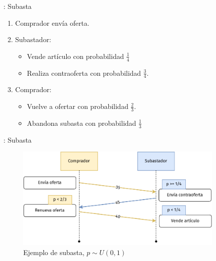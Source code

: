 %
%
%

\begin{frame}{\insertsection: Subasta}
	\begin{enumerate}
		\item Comprador envía oferta.
		\item Subastador:
			\begin{itemize}
				\item Vende artículo con probabilidad $\frac{1}{4}$
				\item Realiza contraoferta con probabilidad $\frac{3}{4}$.
			\end{itemize}
		\item Comprador:
			\begin{itemize}
				\item Vuelve a ofertar con probabilidad $\frac{2}{3}$.
				\item Abandona subasta con probabilidad $\frac{1}{3}$
			\end{itemize}
	\end{enumerate}
\end{frame}

\begin{frame}{\insertsection: Subasta}
	\begin{figure}
		\centering
		\includegraphics[width=0.9\textwidth]{images/auction-diagram.pdf}
		\caption{Ejemplo de subasta, $p \sim U(0, 1)$}
	\end{figure}
\end{frame}

